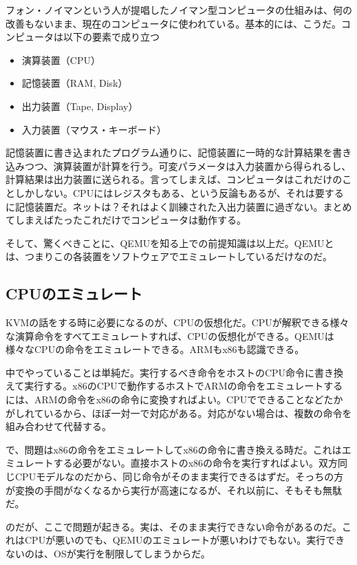 ﻿\documentclass[9pt,b5paper,tombo,openany]{jsbook}
\begin{document}
フォン・ノイマンという人が提唱したノイマン型コンピュータの仕組みは、何の改善もないまま、現在のコンピュータに使われている。基本的には、こうだ。コンピュータは以下の要素で成り立つ

\begin{itemize}
	\item 演算装置（CPU）
	\item 記憶装置（RAM, Disk）
	\item 出力装置（Tape, Display）
	\item 入力装置（マウス・キーボード）
\end{itemize}

記憶装置に書き込まれたプログラム通りに、記憶装置に一時的な計算結果を書き込みつつ、演算装置が計算を行う。可変パラメータは入力装置から得られるし、計算結果は出力装置に送られる。言ってしまえば、コンピュータはこれだけのことしかしない。CPUにはレジスタもある、という反論もあるが、それは要するに記憶装置だ。ネットは？それはよく訓練された入出力装置に過ぎない。まとめてしまえばたったこれだけでコンピュータは動作する。

そして、驚くべきことに、QEMUを知る上での前提知識は以上だ。QEMUとは、つまりこの各装置をソフトウェアでエミュレートしているだけなのだ。

\subsection{CPUのエミュレート}

KVMの話をする時に必要になるのが、CPUの仮想化だ。CPUが解釈できる様々な演算命令をすべてエミュレートすれば、CPUの仮想化ができる。QEMUは様々なCPUの命令をエミュレートできる。ARMもx86も認識できる。

中でやっていることは単純だ。実行するべき命令をホストのCPU命令に書き換えて実行する。x86のCPUで動作するホストでARMの命令をエミュレートするには、ARMの命令をx86の命令に変換すればよい。CPUでできることなどたかがしれているから、ほぼ一対一で対応がある。対応がない場合は、複数の命令を組み合わせて代替する。

で、問題はx86の命令をエミュレートしてx86の命令に書き換える時だ。これはエミュレートする必要がない。直接ホストのx86の命令を実行すればよい。双方同じCPUモデルなのだから、同じ命令がそのまま実行できるはずだ。そっちの方が変換の手間がなくなるから実行が高速になるが、それ以前に、そもそも無駄だ。

のだが、ここで問題が起きる。実は、そのまま実行できない命令があるのだ。これはCPUが悪いのでも、QEMUのエミュレートが悪いわけでもない。実行できないのは、OSが実行を制限してしまうからだ。
\end{document}
